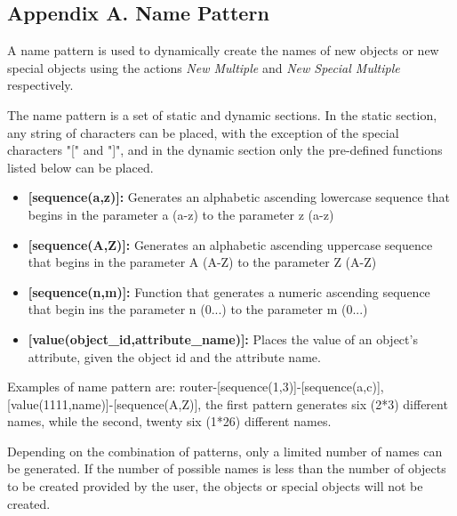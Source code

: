 \documentclass[a4paper]{article}
\begin{document}
		\clearpage
		\begin{appendices}
			\appendix
			\section{Appendix A. Name Pattern} \label{app:AppendixA}
			A name pattern is used to dynamically create the names of new objects or new special objects using the actions \textit{New Multiple} and \textit{New Special Multiple} respectively.			
			
			The name pattern is a set of static and dynamic sections. In the static section, any string of characters can be placed, with the exception of the special characters "[" and "]", and in the dynamic section only the pre-defined functions listed below can be placed.
			
			\begin{itemize}
				\item \textbf{[sequence(a,z)]:} Generates an alphabetic ascending lowercase  sequence that begins in the parameter a (a-z) to the parameter z (a-z)
				\item \textbf{[sequence(A,Z)]:} Generates an alphabetic ascending uppercase sequence that begins in the parameter A (A-Z) to the parameter Z (A-Z)
				\item \textbf{[sequence(n,m)]:} Function that generates a numeric ascending sequence that begin ins the parameter n (0...) to the parameter m (0...)
				\item \textbf{[value(object\_id,attribute\_name)]:} Places the value of an object's attribute, given the object id and the attribute name.
			\end{itemize}
			
			Examples of name pattern are: router-[sequence(1,3)]-[sequence(a,c)], [value(1111,name)]-[sequence(A,Z)], the first pattern generates six (2*3) different names, while the second, twenty six (1*26) different names.
			
			Depending on the combination of patterns, only a limited number of names can be generated. If the number of possible names is less than the number of objects to be created provided by the user, the objects or special objects will not be created.
			\newpage
			\appendix

\end{appendices}
\end{document}
